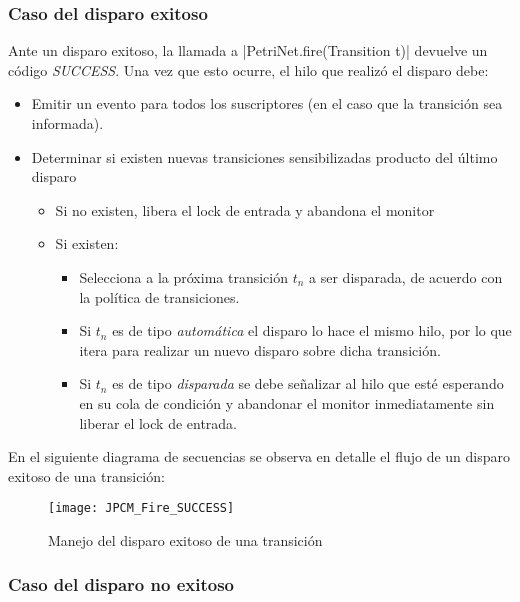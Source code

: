 \subsubsection*{Caso del disparo exitoso}
Ante un disparo exitoso, la llamada a |PetriNet.fire(Transition t)|
devuelve un código \textit{SUCCESS}. Una vez que esto ocurre, el hilo que
realizó el disparo debe:
\begin{itemize}
  \item Emitir un evento para todos los suscriptores (en el caso que la
  transición sea informada).
  \item Determinar si existen nuevas transiciones sensibilizadas producto del
  último disparo
      \begin{itemize}
        \item Si no existen, libera el lock de entrada y abandona el monitor
        \item Si existen:
            \begin{itemize}
                \item Selecciona a la próxima transición $t_{n}$ a ser
                disparada, de acuerdo con la política de transiciones.
                \item Si $t_{n}$ es de tipo \textit{automática} el disparo lo
                hace el mismo hilo, por lo que itera para realizar un nuevo
                disparo sobre dicha transición.
                \item Si $t_{n}$ es de tipo \textit{disparada} se debe
                señalizar al hilo que esté esperando en su cola de condición y
                abandonar el monitor inmediatamente sin liberar el lock de entrada.
            \end{itemize}
      \end{itemize}
\end{itemize}

En el siguiente diagrama de secuencias se observa en detalle el flujo de un
disparo exitoso de una transición:

\begin{figure}[H]
  \centering
  \texttt{[image: JPCM\_Fire\_SUCCESS]}
  \caption{Manejo del disparo exitoso de una transición}
  \label{fig:JPCM_Fire_SUCCESS}
\end{figure}

\subsubsection*{Caso del disparo no exitoso}

